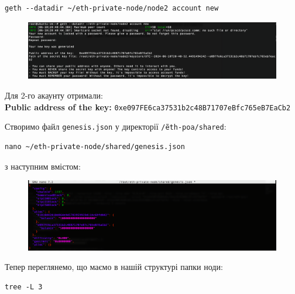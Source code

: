 \newpage
\begin{verbatim}
geth --datadir ~/eth-private-node/node2 account new
\end{verbatim}

\vspace{-0.5cm}

\begin{figure}[ht]
        \centering
        \includegraphics[scale=0.35]{IMAGES/newAcc2.png}
        \label{fig_pacman}
\end{figure}

Для 2-го акаунту отримали: \\
\textbf{Public address of the key:}   \texttt{0xe097FE6ca37531b2c48B71707eBfc765eB7EaCb2}

\vspace{0.5cm}
Створимо файл \texttt{genesis.json} у директорії \texttt{\~/eth-poa/shared}:
\begin{verbatim}
nano ~/eth-private-node/shared/genesis.json
\end{verbatim}

з наступним вмістом:

\vspace{-0.5cm}

\begin{figure}[ht]
        \centering
        \includegraphics[scale=0.35]{IMAGES/genesis.png}
        \label{fig_pacman}
\end{figure}

Тепер переглянемо, що маємо в нашій структурі папки ноди:
\begin{verbatim}
tree -L 3
\end{verbatim}

